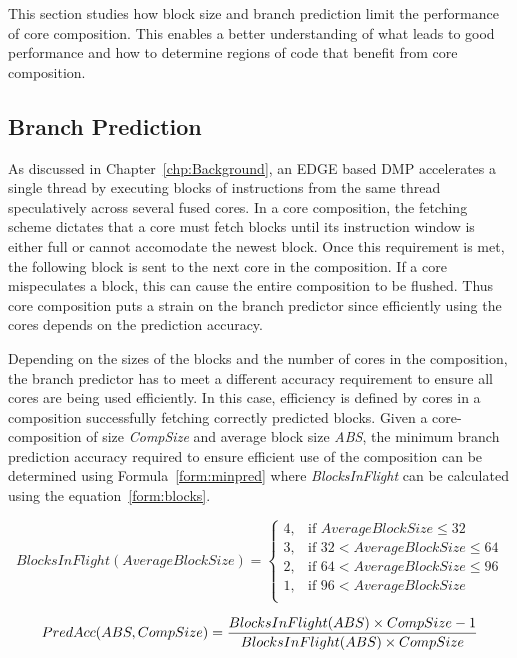 This section studies how block size and branch prediction limit the performance of core composition.
This enables a better understanding of what leads to good performance and how to determine regions of code that benefit from core composition.

\subsection{Branch Prediction}


As discussed in Chapter~\ref{chp:Background}, an EDGE based DMP accelerates a single thread by executing blocks of instructions from the same thread speculatively across several fused cores. 
In a core composition, the fetching scheme dictates that a core must fetch blocks until its instruction window is either full or cannot accomodate the newest block.
Once this requirement is met, the following block is sent to the next core in the composition.
If a core mispeculates a block, this can cause the entire composition to be flushed.
Thus core composition puts a strain on the branch predictor since efficiently using the cores depends on the prediction accuracy.

Depending on the sizes of the blocks and the number of cores in the composition, the branch predictor has to meet a different accuracy requirement to ensure all cores are being used efficiently.
In this case, efficiency is defined by cores in a composition successfully fetching correctly predicted blocks.
Given a core-composition of size \textit{CompSize} and average block size \textit{ABS}, the minimum branch prediction accuracy required to ensure efficient use of the composition can be determined using Formula~\ref{form:minpred} where \textit{BlocksInFlight} can be calculated using the equation~\ref{form:blocks}.

\begin{equation}\label{form:blocks}
BlocksInFlight(AverageBlockSize) = \begin{cases}
4, &\text{if } AverageBlockSize \le 32 \\
3, &\text{if } 32 < AverageBlockSize \le 64 \\
2, &\text{if } 64 < AverageBlockSize \le 96\\
1, &\text{if } 96 < AverageBlockSize\\
\end{cases}
\end{equation}

\begin{equation}\label{form:minpred}
PredAcc(ABS,CompSize)= \frac{BlocksInFlight(ABS) \times CompSize- 1}{BlocksInFlight(ABS) \times CompSize}
\vspace{1em}
\end{equation}

